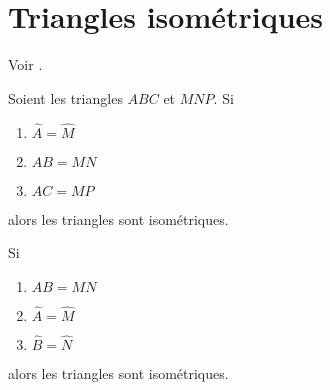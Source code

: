 
\section{Triangles isométriques}

Voir \cite{TqcjwY}.

\begin{propriete}       \label{PropRtqqxJ}
    Soient les triangles \( ABC\) et \( MNP\). Si
    \begin{enumerate}
        \item
            \( \hat A=\hat M\)
        \item
            \( AB=MN\)
        \item
            \( AC=MP\)
    \end{enumerate}
    alors les triangles sont isométriques.

    Si
    \begin{enumerate}
        \item
            \( AB=MN\)
        \item
            \( \hat A=\hat M\)
        \item
            \( \hat B=\hat N\)
    \end{enumerate}
    alors les triangles sont isométriques.
\end{propriete}
